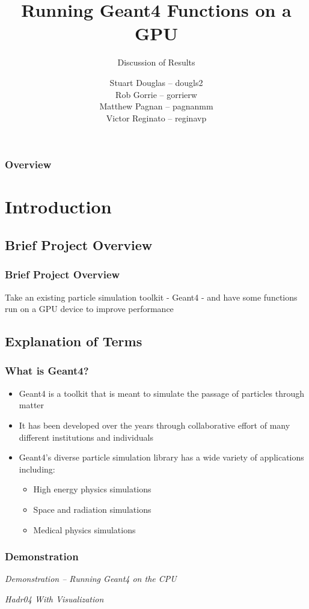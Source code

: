 \documentclass{beamer}
\title[Geant4-GPU (McMaster University)]{Running Geant4 Functions on a GPU}
\subtitle{Discussion of Results}
\institute{McMaster University}
\author[S. Douglas, R. Gorrie, M .Pagnan, V. Reginato]{
Stuart Douglas -- dougls2
\\Rob Gorrie -- gorrierw
\\Matthew Pagnan -- pagnanmm
\\Victor Reginato -- reginavp
}
\begin{document}
\frame{\titlepage}
\begin{frame}
\frametitle{Overview}
\tableofcontents
\end{frame}

\section{Introduction} 

\subsection{Brief Project Overview}
\begin{frame}
\frametitle{Brief Project Overview}
Take an existing particle simulation toolkit - Geant4 - and have some functions run on a GPU device to improve performance
\end{frame}

\subsection{Explanation of Terms}
\begin{frame}
\frametitle{What is Geant4?}
\begin{itemize}
\item Geant4 is a toolkit that is meant to simulate the passage of particles through matter
\item It has been developed over the years through collaborative effort of many different institutions and individuals
\item Geant4's diverse particle simulation library has a wide variety of applications including:
\begin{itemize}
\item High energy physics simulations
\item Space and radiation simulations
\item Medical physics simulations
\end{itemize}
\end{itemize}
\end{frame}

\begin{frame}
\frametitle{Demonstration}
\begin{center}
\emph{Demonstration -- Running Geant4 on the CPU}

\emph{Hadr04 With Visualization}
\end{center}
\end{frame}
\end{document}
